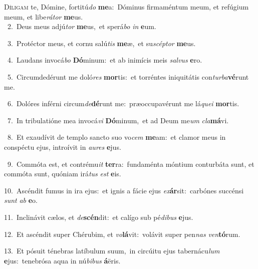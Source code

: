 \lettrine{\initial\textcolor{\initialcolor}{D}}{íligam} te, Dómine, fortitú\textit{do} \textbf{me}\-a:~\star Dóminus firmaméntum meum, et refúgium meum, et libe\-\textit{rá}\-\textit{tor} \textbf{me}\-us.\\
{\numbfont\textcolor{\numbcolor}{~2.}}~Deus meus adjú\textit{tor} \textbf{me}\-us,~\star et sperá\textit{bo} \textit{in} \textbf{e}\-um.\par
{\numbfont\textcolor{\numbcolor}{~3.}}~Protéctor meus, et cornu salú\textit{tis} \textbf{me}\-æ,~\star et su\-\textit{scép}\-\textit{tor} \textbf{me}\-us.\par
{\numbfont\textcolor{\numbcolor}{~4.}}~Laudans invocá\textit{bo} \textbf{Dó}\-minum:~\star et ab inimícis meis \textit{sal}\-\textit{vus} \textbf{e}\-ro.\par
{\numbfont\textcolor{\numbcolor}{~5.}}~Circumdedérunt me doló\textit{res} \textbf{mor}\-tis:~\star et torréntes iniquitátis con\-\textit{tur}\-\textit{ba}\textbf{vé}runt me.\par
{\numbfont\textcolor{\numbcolor}{~6.}}~Dolóres inférni circum\-\textit{de}\-\textbf{dé}runt me:~\star præoccupavérunt me lá\-\textit{que}\-\textit{i} \textbf{mor}\-tis.\par
{\numbfont\textcolor{\numbcolor}{~7.}}~In tribulatióne mea invocá\textit{vi} \textbf{Dó}\-minum,~\star et ad Deum me\textit{um} \textit{cla}\-\textbf{má}vi.\par
{\numbfont\textcolor{\numbcolor}{~8.}}~Et exaudívit de templo sancto suo vo\textit{cem} \textbf{me}\-am:~\star et clamor meus in conspéctu ejus, introívit in \textit{au}\-\textit{res} \textbf{e}\-jus.\par
{\numbfont\textcolor{\numbcolor}{~9.}}~Commóta est, et contrému\textit{it} \textbf{ter}\-ra:~\star fundaménta móntium conturbáta sunt, et commóta sunt, quóniam irá\textit{tus} \textit{est} \textbf{e}\-is.\par
{\numbfont\textcolor{\numbcolor}{10.}}~Ascéndit fumus in ira ejus:~\dagger et ignis a fácie ejus \textit{ex}\-\textbf{ár}sit:~\star carbónes succénsi \textit{sunt} \textit{ab} \textbf{e}\-o.\par
{\numbfont\textcolor{\numbcolor}{11.}}~Inclinávit cælos, et \textit{de}\-\textbf{scén}dit:~\star et calígo sub pé\-\textit{di}\-\textit{bus} \textbf{e}\-jus.\par
{\numbfont\textcolor{\numbcolor}{12.}}~Et ascéndit super Chérubim, et \textit{vo}\-\textbf{lá}vit:~\star volávit super pen\textit{nas} \textit{ven}\-\textbf{tó}rum.\par
{\numbfont\textcolor{\numbcolor}{13.}}~Et pósuit ténebras latíbulum suum,~\dagger in circúitu ejus tabernácu\textit{lum} \textbf{e}\-jus:~\star tenebrósa aqua in nú\-\textit{bi}\-\textit{bus} \textbf{á}\-ëris.\par
